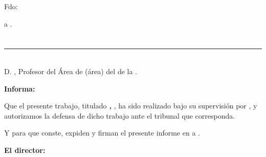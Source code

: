 \vspace{6cm}

\noindent Fdo: \myName

\vspace{2cm}

\begin{flushright}
\myLocation a \myTime.
\end{flushright}


\chapter*{}
\thispagestyle{empty}

\noindent\rule[-1ex]{\textwidth}{2pt}\\[4.5ex]

D. \textbf{\myProf}, Profesor del Área de (área) del \myDepartment de la \myUni.

\vspace{0.5cm}

\textbf{Informa:}

\vspace{0.5cm}

Que el presente trabajo, titulado \textit{\textbf{\myTitle, \mySubtitle}}, ha sido realizado bajo su supervisión por \textbf{\myName}, y autorizamos la defensa de dicho trabajo ante el tribunal que corresponda.

\vspace{0.5cm}

Y para que conste, expiden y firman el presente informe en \myLocation a \myTime.

\vspace{1cm}

\textbf{El director:}

\vspace{5cm}

\noindent \textbf{\myProf}


\dedication{Gracias, peña}
